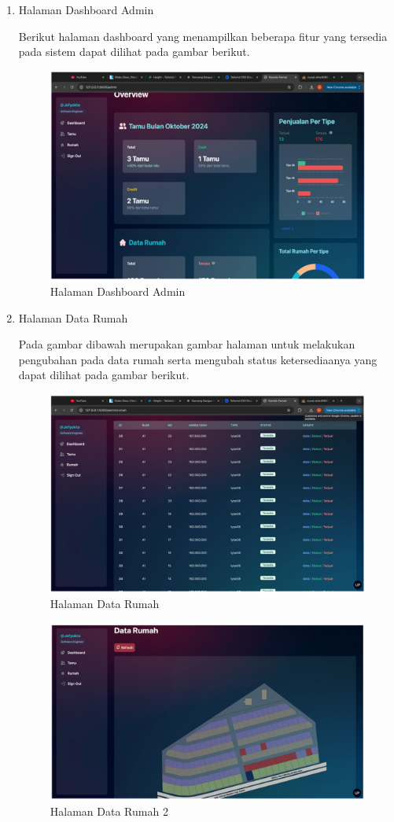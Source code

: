 \begin{enumerate}
    \item Halaman Dashboard Admin
    \par Berikut halaman dashboard yang menampilkan beberapa fitur yang tersedia pada sistem dapat dilihat pada gambar berikut.
    \begin{figure}
        \centering
        \includegraphics[width=0.75\linewidth]{Implementasi/Dashboard Admin.png}
        \caption{Halaman Dashboard Admin}
    \end{figure}
    
    \item Halaman Data Rumah
    \par Pada gambar dibawah merupakan gambar halaman untuk melakukan pengubahan pada data rumah serta mengubah status ketersediaanya yang dapat dilihat pada gambar berikut.
    \begin{figure}
        \centering
        \includegraphics[width=0.75\linewidth]{Implementasi/Data Rumah.png}
        \caption{Halaman Data Rumah}
    \end{figure}

	 \begin{figure}
	        \centering
	        \includegraphics[width=0.75\linewidth]{Implementasi/Data Rumah 2.png}
	        \caption{Halaman Data Rumah 2}
	    \end{figure}
    

\end{enumerate}
